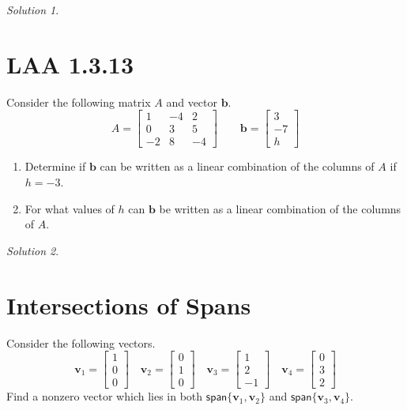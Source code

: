 \documentclass{article}
\theoremstyle{remark}
\newtheorem*{solution}{Solution}
\begin{document}
\medskip

\begin{solution}
\end{solution}

\pagebreak
\section{LAA 1.3.13}
Consider the following matrix $A$ and vector $\mathbf b$.
\begin{displaymath}
  A =
  \begin{bmatrix}
    1 & -4 & 2 \\
    0 & 3 & 5 \\
    -2 & 8 & -4
  \end{bmatrix}
  \qquad
  \mathbf b =
  \begin{bmatrix}
    3 \\ -7 \\ h
  \end{bmatrix}
\end{displaymath}
\begin{enumerate}
\item Determine if $\mathbf b$ can be written as a linear combination of the columns of $A$ if $h = -3$.
\item For what values of $h$ can $\mathbf b$ be written as a linear combination of the columns of $A$.
\end{enumerate}

\medskip

\begin{solution}
\end{solution}

\pagebreak
\section{Intersections of Spans}
Consider the following vectors.
\begin{displaymath}
  \mathbf v_1 =
  \begin{bmatrix}
    1 \\ 0 \\ 0
  \end{bmatrix}
  \quad
  \mathbf v_2 =
  \begin{bmatrix}
    0 \\ 1 \\ 0
  \end{bmatrix}
  \quad
  \mathbf v_3 =
  \begin{bmatrix}
    1 \\ 2 \\ -1
  \end{bmatrix}
  \quad
  \mathbf v_4 =
  \begin{bmatrix}
    0  \\ 3 \\ 2
  \end{bmatrix}
\end{displaymath}
Find a nonzero vector which lies in both $\mathsf{span}\{\mathbf v_1, \mathbf v_2\}$ and $\mathsf{span}\{\mathbf v_3, \mathbf v_4\}$.
\end{document}
